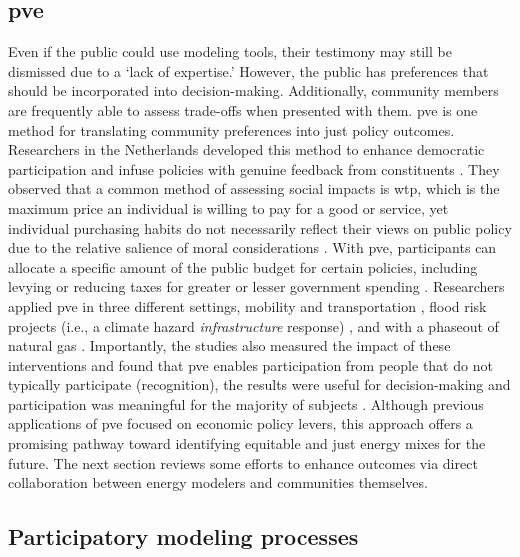 \subsection{\Acl{pve}}

Even if the public could use modeling tools, their testimony may still be
dismissed due to a `lack of expertise.' However, the public has preferences that
should be incorporated into decision-making. Additionally, community members are
frequently able to assess trade-offs when presented with them. \Acf{pve} is one
method for translating community preferences into just policy outcomes.
Researchers in the Netherlands developed this method to enhance democratic
participation and infuse policies with genuine feedback from constituents
\cite{mouter_introduction_2019}. They observed that a common method of assessing
social impacts is \ac{wtp}, which is the maximum price an individual is willing
to pay for a good or service, yet individual purchasing habits do not
necessarily reflect their views on public policy due to the relative salience of
moral considerations \cite{mouter_introduction_2019}. With \ac{pve},
participants can allocate a specific amount of the public budget for certain
policies, including levying or reducing taxes for greater or lesser government
spending \cite{mouter_introduction_2019}. Researchers applied \ac{pve} in three
different settings, mobility and transportation \cite{mouter_contrasting_2021},
flood risk projects (i.e., a climate hazard \textit{infrastructure} response)
\cite{dekker_economics_2019}, and with a phaseout of natural gas
\cite{mouter_including_2021}. Importantly, the studies also measured the impact
of these interventions and found that \ac{pve} enables participation from people
that do not typically participate (recognition), the results were useful for
decision-making and participation was meaningful for the majority of subjects
\cite{mouter_including_2021}. Although previous applications of \ac{pve} focused
on economic policy levers, this approach offers a promising pathway toward
identifying equitable and just energy mixes for the future. The next section
reviews some efforts to enhance outcomes via direct collaboration between energy
modelers and communities themselves.

\subsection{Participatory modeling processes}

